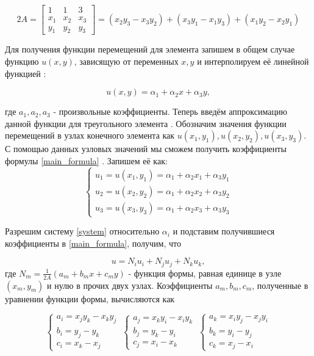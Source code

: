\documentclass[a4paper, 14pt]{extarticle}
\begin{document}
\begin{equation*}
2A = 
\begin{bmatrix}
1 & 1 & 3\\
x_1 & x_2 & x_3 \\ 
y_1 & y_2 & y_3
\end{bmatrix}
= (x_2 y_3 - x_3 y_2) + (x_3 y_1 - x_1 y_3) + (x_1 y_2 - x_2 y_1)
\end{equation*}

\newpage

Для получения функции перемещений для элемента запишем в общем случае функцию $u(x, y)$, зависящую от переменных $x, y$ и интерполируем её линейной функцией \cite{9}:

\begin{equation}\label{main_formula}
u(x, y) = \alpha_1 + \alpha_2 x + \alpha_3 y,
\end{equation} 

где $a_1, a_2, a_3$ - произвольные коэффициенты. Теперь введём аппроксимацию данной функции для треугольного элемента \cite{10}. Обозначим значения функции перемещений в узлах конечного элемента как $u(x_1, y_1), u(x_2, y_2), u(x_3, y_3)$. С помощью данных узловых значений мы сможем получить коэффициенты формулы \ref{main_formula} \cite{11}. Запишем её как:
\begin{equation}\label{system}
\left\{\begin{matrix}
u_1 = u(x_1, y_1) = \alpha_1 + \alpha_2 x_1 + \alpha_3 y_1\\
u_2 = u(x_2, y_2) = \alpha_1 + \alpha_2 x_2 + \alpha_3 y_2 \\
u_3 = u(x_3, y_3) = \alpha_1 + \alpha_2 x_3 + \alpha_3 y_3 
\end{matrix}\right.
\end{equation}

Разрешим систему \ref{system} относительно $\alpha_i$ и подставим получившиеся коэффициенты в \ref{main_formula}, получим, что

\begin{equation*}
u = N_i u_i + N_j u_j + N_k u_k,
\end{equation*}
где $N_m = \frac{1}{2A}(a_m + b_m x + c_m y)$ - функция формы, равная единице в узле $(x_m, y_m)$ и нулю в прочих двух узлах. Коэффициенты $a_m, b_m, c_m$, полученные в уравнении функции формы, вычисляются как

\begin{equation*}
\left\{\begin{matrix}
a_i = x_j y_k - x_k y_j \\
b_i = y_j - y_k \\
c_i = x_k - x_j
\end{matrix}\right.
\
\left\{\begin{matrix}
a_j = x_k y_i - x_i y_k \\
b_j = y_k - y_i \\
c_j = x_i - x_k
\end{matrix}\right.
\
\left\{\begin{matrix}
a_k = x_i y_j - x_j y_i \\
b_k = y_i - y_j \\
c_k = x_j - x_i
\end{matrix}\right.
\end{equation*}
\end{document}
